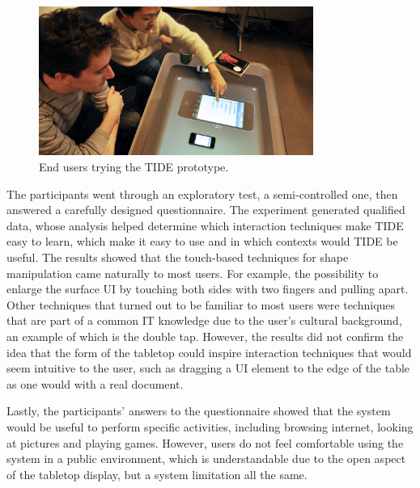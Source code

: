 \begin{figure}[htb]
  \centering
    \includegraphics[width=0.8\textwidth]{images/368}
  \caption{End users trying the TIDE prototype.}
  \label{fig:368}
\end{figure}

The participants went through an exploratory test, a semi-controlled one, then answered a carefully designed questionnaire. The experiment generated qualified data, whose analysis helped determine which interaction techniques make TIDE easy to learn, which make it easy to use and in which contexts would TIDE be useful.
The results showed that the touch-based techniques for shape manipulation came naturally to most users.
For example, the possibility to enlarge the surface UI by touching both sides with two fingers and pulling apart.
Other techniques that turned out to be familiar to most users were techniques that are part of a common IT knowledge due to the user's cultural background, an example of which is the double tap.
However, the results did not confirm the idea that the form of the tabletop could inspire interaction techniques that would seem intuitive to the user, such as dragging a UI element to the edge of the table as one would with a real document.

Lastly, the participants' answers to the questionnaire showed that the system would be useful to perform specific activities, including browsing internet, looking at pictures and playing games.
However, users do not feel comfortable using the system in a public environment, which is understandable due to the open aspect of the tabletop display, but a system limitation all the same.

%

